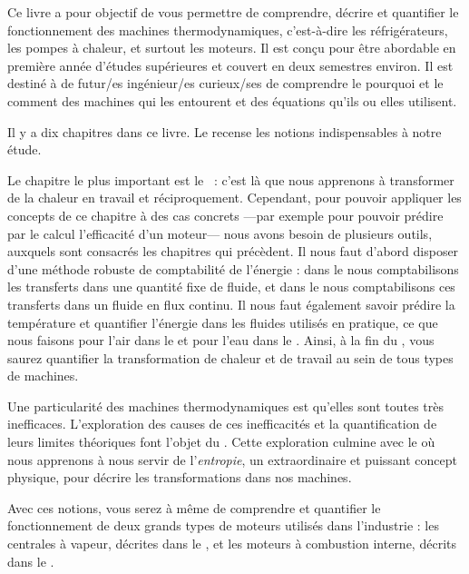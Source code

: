 Ce livre a pour objectif de vous permettre de comprendre, décrire et quantifier le fonctionnement des machines thermodynamiques, c’est-à-dire les réfrigérateurs, les pompes à chaleur, et surtout les moteurs. Il est conçu pour être abordable en première année d’études supérieures et couvert en deux semestres environ. Il est destiné à de futur/es ingénieur/es curieux/ses de comprendre le pourquoi et le comment des machines qui les entourent et des équations qu’ils ou elles utilisent.

Il y a dix chapitres dans ce livre. Le \coursun recense les notions indispensables à notre étude.

Le chapitre le plus important est le \courssix~: c’est là que nous apprenons à transformer de la chaleur en travail et réciproquement. Cependant, pour pouvoir appliquer les concepts de ce chapitre à des cas concrets —par exemple pour pouvoir prédire par le calcul l’efficacité d’un moteur— nous avons besoin de plusieurs outils, auxquels sont consacrés les chapitres qui précèdent. Il nous faut d’abord disposer d’une méthode robuste de comptabilité de l’énergie : dans le \coursdeux nous comptabilisons les transferts dans une quantité fixe de fluide, et dans le \courstrois nous comptabilisons ces transferts dans un fluide en flux continu. Il nous faut également savoir prédire la température et quantifier l’énergie dans les fluides utilisés en pratique, ce que nous faisons pour l’air dans le \coursquatre et pour l’eau dans le \courscinq. Ainsi, à la fin du \courssixshort, vous saurez quantifier la transformation de chaleur et de travail au sein de tous types de machines.

Une particularité des machines thermodynamiques est qu’elles sont toutes très inefficaces. L’exploration des causes de ces inefficacités et la quantification de leurs limites théoriques font l’objet du \courssept. Cette exploration culmine avec le \courshuitshort où nous apprenons à nous servir de l’\textit{entropie}, un extraordinaire et puissant concept physique, pour décrire les transformations dans nos machines.

Avec ces notions, vous serez à même de comprendre et quantifier le fonctionnement de deux grands types de moteurs utilisés dans l’industrie : les centrales à vapeur, décrites dans le \coursneuf, et les moteurs à combustion interne, décrits dans le \coursdix.

\onlyamphibook{\clearpage\thispagestyle{empty}}%
\begin{center}
\end{center}

